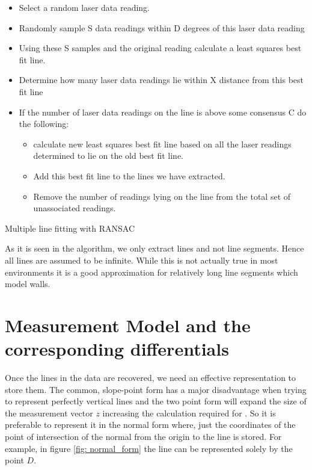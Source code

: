\begin{algorithm}[H]
\begin{algorithmic}

	\begin{itemize}
	\item Select a random laser data reading. 
	\item Randomly sample S data readings within D degrees of this laser 
	data reading 
	\item Using these S samples and the original reading calculate a 
	least squares best fit line. 
	\item Determine how many laser data readings lie within X distance 
	from this best fit line
	\item If the number of laser data readings on the line is above some 
	consensus C do the following: 
		\begin{itemize}
			\item calculate new least squares best fit line based on all 
			the laser readings determined to lie on the old best fit 
			line. 
			\item Add this best fit line to the lines we have extracted. 
			\item Remove the number of readings lying on the line from the 
			total set of unassociated readings.
		\end{itemize}
	\end{itemize}
	\EndWhile
\end{algorithmic}
	\caption{Multiple line fitting with RANSAC}
	\label{alg: RANSAC algorithm}
\end{algorithm}

As it is seen in the algorithm, we only extract lines and not line segments. Hence all lines are assumed to be infinite. While this is not actually true in most environments it is a good approximation for relatively long line segments which model walls.


\section{Measurement Model and the corresponding differentials}
\label{sec:Ransac_math}
Once the lines in the data are recovered, we need an effective representation to store them. The common, slope-point form has a major disadvantage when trying to represent perfectly vertical lines and the two point form will expand the size of the measurement vector $ z $ increasing the calculation required for \ekf. So it is preferable to represent it in the normal form where, just the coordinates of the point of intersection of the normal from the origin to the line is stored. For example, in figure \ref{fig: normal_form} the line can be represented solely by the point $ D $.

